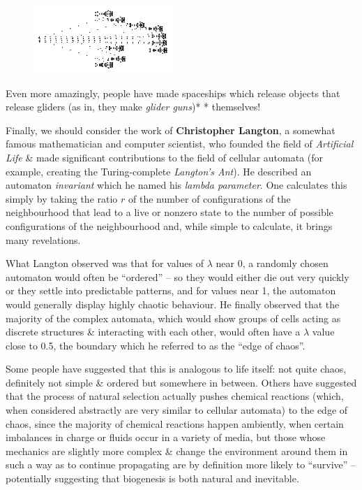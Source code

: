 \documentclass[10pt,a4paper]{article}
\begin{document}
\begin{multicols}{2}
\begin{figure}[htbp]
	\centering
	\includegraphics[width=\linewidth]{image_5.png}
	\caption{}
\end{figure}

Even more amazingly, people have made spaceships which release objects
that release gliders (as in, they make \emph{glider guns})* *
themselves!

Finally, we should consider the work of \textbf{Christopher Langton}, a
somewhat famous mathematician and computer scientist, who founded the
field of \emph{Artificial Life} \& made significant contributions to the
field of cellular automata (for example, creating the Turing-complete
\emph{Langton's Ant}). He described an automaton \emph{invariant} which
he named his \emph{lambda parameter}. One calculates this simply by
taking the ratio \(r\) of the number of configurations of the
neighbourhood that lead to a live or nonzero state to the number of
possible configurations of the neighbourhood and, while simple to
calculate, it brings many revelations.

What Langton observed was that for values of \(\lambda\) near 0, a randomly
chosen automaton would often be ``ordered'' -- so they would either die
out very quickly or they settle into predictable patterns, and for
values near 1, the automaton would generally display highly chaotic
behaviour. He finally observed that the majority of the complex
automata, which would show groups of cells acting as discrete structures
\& interacting with each other, would often have a \(\lambda\) value close to
0.5, the boundary which he referred to as the ``edge of chaos''.

Some people have suggested that this is analogous to life itself: not
quite chaos, definitely not simple \& ordered but somewhere in between.
Others have suggested that the process of natural selection actually
pushes chemical reactions (which, when considered abstractly are very
similar to cellular automata) to the edge of chaos, since the majority
of chemical reactions happen ambiently, when certain imbalances in
charge or fluids occur in a variety of media, but those whose mechanics
are slightly more complex \& change the environment around them in such
a way as to continue propagating are by definition more likely to
``survive'' -- potentially suggesting that biogenesis is both natural
and inevitable.


\end{multicols}
\end{document}

